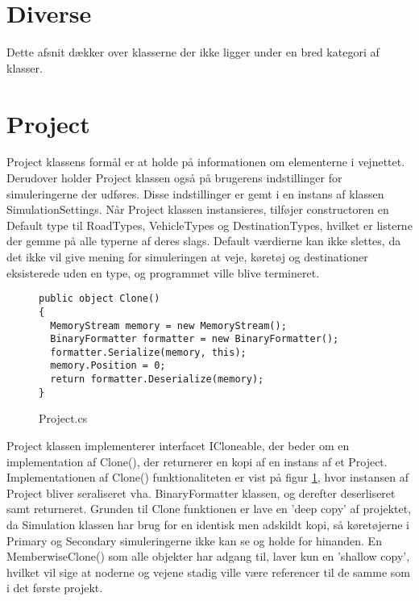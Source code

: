 \section{Diverse}\label{Diverse}
Dette afsnit dækker over klasserne der ikke ligger under en bred kategori af klasser.

\section{Project}
Project klassens formål er at holde på informationen om elementerne i vejnettet. Derudover holder Project klassen også på brugerens indstillinger for simuleringerne der udføres. Disse indstillinger er gemt i en instans af klassen SimulationSettings. Når Project klassen instansieres, tilføjer constructoren en Default type til RoadTypes, VehicleTypes og DestinationTypes, hvilket er listerne der gemme på alle typerne af deres slags. Default værdierne kan ikke slettes, da det ikke vil give mening for simuleringen at veje, køretøj og destinationer eksisterede uden en type, og programmet ville blive termineret. 

\begin{figure}[H]
\begin{lstlisting} 
public object Clone()
{
  MemoryStream memory = new MemoryStream();
  BinaryFormatter formatter = new BinaryFormatter();
  formatter.Serialize(memory, this);
  memory.Position = 0;
  return formatter.Deserialize(memory);
}
\end{lstlisting}
\caption{Project.cs}\label{Project}
\end{figure}

Project klassen implementerer interfacet ICloneable, der beder om en implementation af Clone(), der returnerer en kopi af en instans af et Project. Implementationen af Clone() funktionaliteten er vist på figur \ref{Project}, hvor instansen af Project bliver seraliseret vha. BinaryFormatter klassen, og derefter deserliseret samt returneret. Grunden til Clone funktionen er lave en 'deep copy' af projektet, da Simulation klassen har brug for en identisk men adskildt kopi, så køretøjerne i Primary og Secondary simuleringerne ikke kan se og holde for hinanden. En MemberwiseClone() som alle objekter har adgang til, laver kun en 'shallow copy', hvilket vil sige at noderne og vejene stadig ville være referencer til de samme som i det første projekt.

